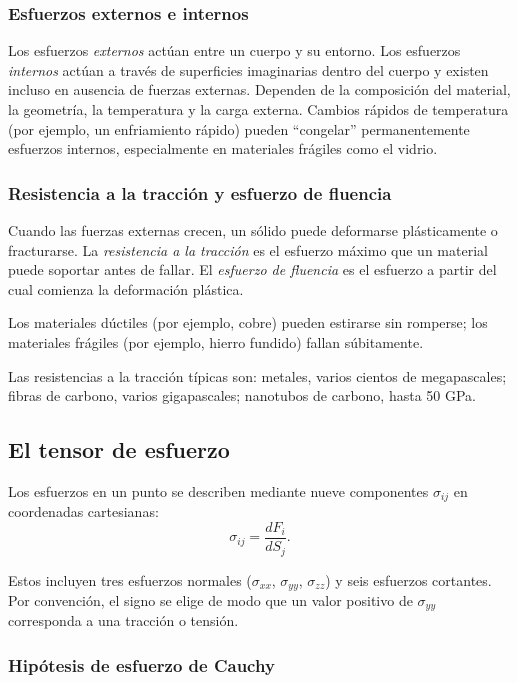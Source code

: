 \subsubsection{Esfuerzos externos e internos}

Los esfuerzos \emph{externos} actúan entre un cuerpo y su entorno. Los esfuerzos \emph{internos} actúan a través de superficies imaginarias dentro del cuerpo y existen incluso en ausencia de fuerzas externas. Dependen de la composición del material, la geometría, la temperatura y la carga externa. Cambios rápidos de temperatura (por ejemplo, un enfriamiento rápido) pueden ``congelar'' permanentemente esfuerzos internos, especialmente en materiales frágiles como el vidrio.

\subsubsection{Resistencia a la tracción y esfuerzo de fluencia}

Cuando las fuerzas externas crecen, un sólido puede deformarse plásticamente o fracturarse. La \emph{resistencia a la tracción} es el esfuerzo máximo que un material puede soportar antes de fallar. El \emph{esfuerzo de fluencia} es el esfuerzo a partir del cual comienza la deformación plástica.

Los materiales dúctiles (por ejemplo, cobre) pueden estirarse sin romperse; los materiales frágiles (por ejemplo, hierro fundido) fallan súbitamente.

Las resistencias a la tracción típicas son: metales, varios cientos de megapascales; fibras de carbono, varios gigapascales; nanotubos de carbono, hasta 50 GPa.

\subsection{El tensor de esfuerzo}

Los esfuerzos en un punto se describen mediante nueve componentes $\sigma_{ij}$ en coordenadas cartesianas:
$$ \sigma_{ij} = \frac{dF_i}{dS_j}. $$

Estos incluyen tres esfuerzos normales ($\sigma_{xx}$, $\sigma_{yy}$, $\sigma_{zz}$) y seis esfuerzos cortantes. Por convención, el signo se elige de modo que un valor positivo de $\sigma_{yy}$ corresponda a una tracción o tensión.

\subsubsection{Hipótesis de esfuerzo de Cauchy}

